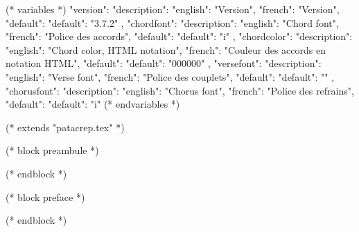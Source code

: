 %
%
%

(* variables *)
{
"version":{ "description": {"english": "Version", "french": "Version"},
            "default": {"default": "3.7.2"}
         },
"chordfont":{ "description": {"english": "Chord font",
                          "french": "Police des accords"},
            "default": {"default": "i"}
         },
"chordcolor":{ "description": {"english": "Chord color, HTML notation",
                          "french": "Couleur des accords en notation HTML"},
            "default": {"default": "000000"}
         },
"versefont":{ "description": {"english": "Verse font",
                          "french": "Police des couplets"},
            "default": {"default": ""}
         },
"chorusfont":{ "description": {"english": "Chorus font",
                          "french": "Police des refrains"},
            "default": {"default": "i"}
         }
}
(* endvariables *)

(* extends "patacrep.tex" *)

(* block preambule *)
\usepackage{licence}
\makeatletter
\renewcommand{\chorusfont}{%
   (* for letter in chorusfont *)
   (* if letter=="i" *)   \it %
   (* elif letter=='b' *)   \bf %
   (* elif letter=='n' *)   \normalfont %
   (* endif *)
   (* endfor *)
}

\def\@chordfont{%
   (* for letter in chordfont *)
   (* if letter=="i" *)   \it %
   (* elif letter=='b' *)   \bf %
   (* elif letter=='n' *)   \normalfont %
   (* endif *)
   (* endfor *)
}
\renewcommand{\printchord}[1]{\@chordfont\textcolor{ChordColor}{#1}}

\renewcommand{\lyricfont}{%
   (* for letter in versefont *)
   (* if letter=="i" *)   \it %
   (* elif letter=='b' *)   \bf %
   (* elif letter=='n' *)   \normalfont %
   (* endif *)
   (* endfor *)
}
\makeatother
(* endblock *)

(* block preface *)
\newpage

\newpage
(* endblock *)
